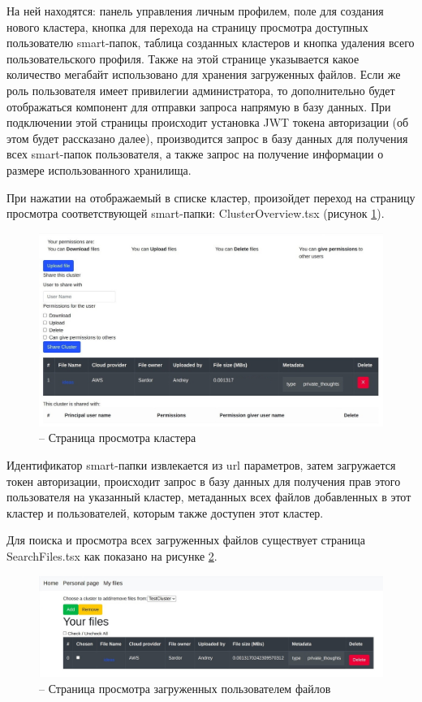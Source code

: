 На ней находятся: панель управления личным профилем, поле для создания нового кластера, кнопка для перехода на страницу просмотра доступных пользователю smart-папок, таблица созданных кластеров и кнопка удаления всего пользовательского профиля. Также на этой странице указывается какое количество мегабайт использовано для хранения загруженных файлов.
Если же роль пользователя имеет привилегии администратора, то дополнительно будет отображаться компонент для отправки запроса напрямую в базу данных.
При подключении этой страницы происходит установка JWT токена авторизации (об этом будет рассказано далее), производится запрос в базу данных для получения всех smart-папок пользователя, а также запрос на получение информации о размере использованного хранилища.

При нажатии на отображаемый в списке кластер, произойдет переход на страницу просмотра соответствующей smart-папки: ClusterOverview.tsx (рисунок \ref{clusterPage}).
\begin{figure}[H]
    \centering
    \includegraphics[scale=0.6]{images/ui/2_ClusterPage.jpg}
    \caption{-- Страница просмотра кластера}
    \label{clusterPage}
\end{figure}

Идентификатор smart-папки извлекается из url параметров, затем загружается токен авторизации, происходит запрос в базу данных для получения прав этого пользователя на указанный кластер, метаданных всех файлов добавленных в этот кластер и пользователей, которым также доступен этот кластер.

Для поиска и просмотра всех загруженных файлов существует страница SearchFiles.tsx как показано на рисунке \ref{filesPage}.
\begin{figure}[H]
    \centering
    \includegraphics[scale=0.53]{images/ui/3_FilesPage.jpg}
    \caption{-- Страница просмотра загруженных пользователем файлов}
    \label{filesPage}
\end{figure} 

